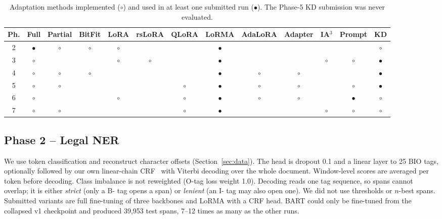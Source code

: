 \documentclass[11pt, oneside]{article}
\newcommand{\tsc}[1]{\texttt{\detokenize{#1}}}
\begin{document}
\begin{table}[t]
\centering
\footnotesize
\caption{Adaptation methods implemented ($\circ$) and used in at least one submitted run ($\bullet$). The Phase-5 KD submission was never evaluated.}
\label{tab:methods}
\setlength{\tabcolsep}{3pt}
\begin{adjustbox}{max width=\textwidth}\begin{tabular}{c c c c c c c c c c c c c}
\toprule
Ph. & Full & Partial & BitFit & LoRA & rsLoRA & QLoRA & LoRMA & AdaLoRA & Adapter & IA$^3$ & Prompt & KD \\
\midrule
2 & $\bullet$ & $\circ$ & $\circ$ & $\circ$ & & & $\bullet$ & & & & & $\circ$ \\
3 & $\circ$ & & & $\circ$ & $\circ$ & & $\bullet$ & & & $\circ$ & $\circ$ & $\bullet$ \\
4 & $\circ$ & $\circ$ & $\circ$ & & & & $\bullet$ & $\circ$ & $\circ$ & & & $\bullet$ \\
5 & $\circ$ & $\circ$ & & & & $\circ$ & $\bullet$ & $\circ$ & $\circ$ & & $\circ$ & $\bullet$ \\
6 & $\circ$ & & & $\circ$ & & $\circ$ & $\bullet$ & $\circ$ & $\circ$ & & $\bullet$ & $\circ$ \\
7 & $\circ$ & $\circ$ & & & & $\circ$ & $\bullet$ & & & $\circ$ & $\circ$ & $\circ$ \\
\bottomrule
\end{tabular}\end{adjustbox}
\end{table}

\subsection{Phase 2 -- Legal NER}
We use token classification and reconstruct character offsets (Section~\ref{sec:data}). The head is dropout 0.1 and a linear layer to 25 BIO tags, optionally followed by our own linear-chain CRF~\cite{lafferty2001crf} with Viterbi decoding over the whole document. Window-level scores are averaged per token before decoding. Class imbalance is not reweighted (O-tag loss weight 1.0). Decoding reads one tag sequence, so spans cannot overlap; it is either \emph{strict} (only a B- tag opens a span) or \emph{lenient} (an I- tag may also open one). We did not use thresholds or $n$-best spans. Submitted variants are full fine-tuning of three backbones and \tsc{llama} LoRMA with a CRF head. BART could only be fine-tuned from the collapsed v1 checkpoint and produced 39,953 test spans, 7--12 times as many as the other runs.
\end{document}
